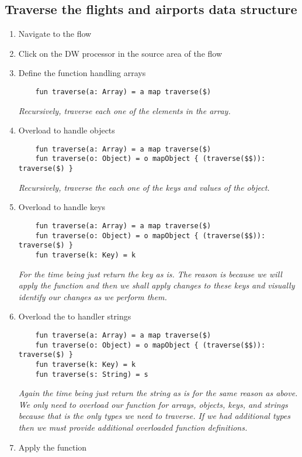 \subsection{Traverse the flights and airports data structure}
\begin{enumerate}
\item Navigate to the  flow
\item Click on the DW processor in the source area of the flow
\item Define the  function handling arrays
  \begin{lstlisting}
    fun traverse(a: Array) = a map traverse($)
  \end{lstlisting}
  \emph{
    Recursively, traverse each one of the elements in the array.
  }
\item Overload  to handle objects
  \begin{lstlisting}
    fun traverse(a: Array) = a map traverse($)
    fun traverse(o: Object) = o mapObject { (traverse($$)): traverse($) }
  \end{lstlisting}
  \emph{
    Recursively, traverse the each one of the keys and values of the object. 
  }
\item Overload  to handle keys
  \begin{lstlisting}
    fun traverse(a: Array) = a map traverse($)
    fun traverse(o: Object) = o mapObject { (traverse($$)): traverse($) }
    fun traverse(k: Key) = k
  \end{lstlisting}
  \emph{
    For the time being just return the key as is.  The reason is because we will apply the function and then we shall apply changes to these keys and visually identify our changes as we perform them.
  }
\item Overload the  to handler strings
  \begin{lstlisting}
    fun traverse(a: Array) = a map traverse($)
    fun traverse(o: Object) = o mapObject { (traverse($$)): traverse($) }
    fun traverse(k: Key) = k
    fun traverse(s: String) = s
  \end{lstlisting}
  \emph{
    Again the time being just return the string as is for the same reason as above.
    \newline
    We only need to overload our  function for arrays, objects, keys, and strings because that is the only types we need to traverse.  If we had additional types then we must provide additional overloaded function definitions.
  }
\item Apply the  function

\end{enumerate}
